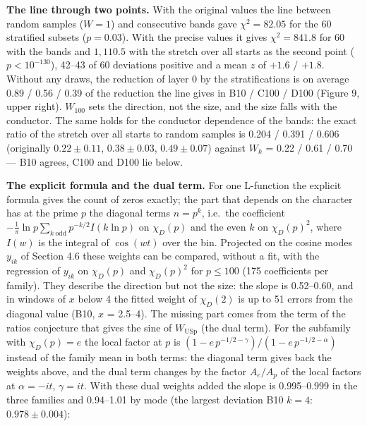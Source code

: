 \documentclass[
  10pt,
]{article}
\begin{document}
\textbf{The line through two points.} With the original values the line
between random samples (\(W = 1\)) and consecutive bands gave
\(\chi^2 = 82.05\) for the 60 stratified subsets (\(p = 0.03\)). With
the precise values it gives \(\chi^2 = 841.8\) for 60 with the bands and
\(1{,}110.5\) with the stretch over all starts as the second point
(\(p < 10^{-130}\)), 42--43 of 60 deviations positive and a mean \(z\)
of \(+1.6\) / \(+1.8\). Without any draws, the reduction of layer 0 by
the stratifications is on average 0.89 / 0.56 / 0.39 of the reduction
the line gives in B10 / C100 / D100 (Figure 9, upper right). \(W_{100}\)
sets the direction, not the size, and the size falls with the conductor.
The same holds for the conductor dependence of the bands: the exact
ratio of the stretch over all starts to random samples is 0.204 / 0.391
/ 0.606 (originally \(0.22 \pm 0.11\), \(0.38 \pm 0.03\),
\(0.49 \pm 0.07\)) against \(W_k\) = 0.22 / 0.61 / 0.70 --- B10 agrees,
C100 and D100 lie below.

\textbf{The explicit formula and the dual term.} For one L-function the
explicit formula gives the count of zeros exactly; the part that depends
on the character has at the prime \(p\) the diagonal terms \(n = p^k\),
i.e.~the coefficient
\(-\frac{1}{\pi}\ln p \sum_{k\ \mathrm{odd}} p^{-k/2} I(k\ln p)\) on
\(\chi_D(p)\) and the even \(k\) on \(\chi_D(p)^2\), where \(I(w)\) is
the integral of \(\cos(wt)\) over the bin. Projected on the cosine modes
\(y_{ik}\) of Section 4.6 these weights can be compared, without a fit,
with the regression of \(y_{ik}\) on \(\chi_D(p)\) and \(\chi_D(p)^2\)
for \(p \le 100\) (175 coefficients per family). They describe the
direction but not the size: the slope is 0.52--0.60, and in windows of
\(x\) below 4 the fitted weight of \(\chi_D(2)\) is up to 51 errors from
the diagonal value (B10, \(x\) = 2.5--4). The missing part comes from
the term of the ratios conjecture that gives the sine of
\(W_{\mathrm{USp}}\) (the dual term). For the subfamily with
\(\chi_D(p) = e\) the local factor at \(p\) is
\((1 - e\,p^{-1/2-\gamma})/(1 - e\,p^{-1/2-\alpha})\) instead of the
family mean in both terms: the diagonal term gives back the weights
above, and the dual term changes by the factor \(A_e/A_p\) of the local
factors at \(\alpha = -it\), \(\gamma = it\). With these dual weights
added the slope is 0.995--0.999 in the three families and 0.94--1.01 by
mode (the largest deviation B10 \(k = 4\): \(0.978 \pm 0.004\)):
\end{document}
